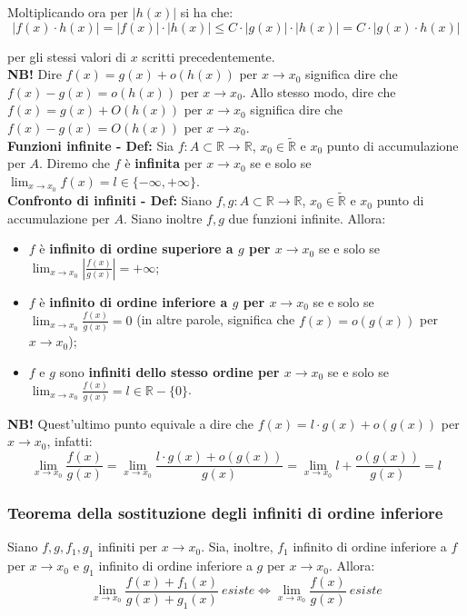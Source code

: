 \documentclass{article}
\begin{document}
\noindent Moltiplicando ora per $|h(x)|$ si ha che:
\begin{equation*}
    |f(x) \cdot h(x)| = |f(x)| \cdot |h(x)| \leq C \cdot |g(x)| \cdot |h(x)| = C \cdot |g(x) \cdot h(x)|
\end{equation*}

\noindent per gli stessi valori di $x$ scritti precedentemente.\\

\noindent\textbf{NB!} Dire $f(x) = g(x) + o(h(x))$ per $x \to x_0$ significa dire che $f(x) - g(x) = o(h(x))$ per $x \to x_0$. Allo stesso modo, dire che  $f(x) = g(x) + O(h(x))$ per $x \to x_0$ significa dire che $f(x) - g(x) = O(h(x))$ per $x \to x_0$. \\

\noindent\textbf{Funzioni infinite - Def:} Sia $f: A \subset \mathbb{R} \xrightarrow{} \mathbb{R}$, $x_0 \in \widetilde{\mathbb{R}}$ e $x_0$ punto di accumulazione per $A$. Diremo che $f$ è \textbf{infinita} per $x \to x_0$ se e solo se $\lim_{x \to x_0} f(x) = l \in \{-\infty, +\infty\}$.\\

\noindent\textbf{Confronto di infiniti - Def:} Siano $f, g: A \subset \mathbb{R} \xrightarrow{} \mathbb{R}$, $x_0 \in \widetilde{\mathbb{R}}$ e $x_0$ punto di accumulazione per $A$. Siano inoltre $f, g$ due funzioni infinite. Allora:
\begin{itemize}
    \item $f$ è \textbf{infinito di ordine superiore a $g$ per $x \to x_0$} se e solo se $\lim_{x \to x_0} \left|\frac{f(x)}{g(x)}\right| = +\infty$;
    \item $f$ è \textbf{infinito di ordine inferiore a $g$ per $x \to x_0$} se e solo se $\lim_{x \to x_0} \frac{f(x)}{g(x)} = 0$ (in altre parole, significa che $f(x) = o(g(x))$ per $x \to x_0$);
    \item $f$ e $g$ sono \textbf{infiniti dello stesso ordine per $x \to x_0$} se e solo se $\lim_{x \to x_0} \frac{f(x)}{g(x)} = l \in \mathbb{R} - \{0\}$.
\end{itemize}

\noindent\textbf{NB!} Quest'ultimo punto equivale a dire che $f(x) = l \cdot g(x) + o(g(x))$ per $x \to x_0$, infatti:
\begin{equation*}
    \lim_{x \to x_0} \frac{f(x)}{g(x)} = \lim_{x \to x_0} \frac{l \cdot g(x) + o(g(x))}{g(x)} = \lim_{x \to x_0} l + \frac{o(g(x))}{g(x)} = l
\end{equation*}

\subsubsection{Teorema della sostituzione degli infiniti di ordine inferiore}
Siano $f, g, f_1, g_1$ infiniti per $x \to x_0$. Sia, inoltre, $f_1$ infinito di ordine inferiore a $f$ per $x \to x_0$ e $g_1$ infinito di ordine inferiore a $g$ per $x \to x_0$. Allora:
\begin{equation*}
    \lim_{x \to x_0} \frac{f(x) + f_1(x)}{g(x) + g_1(x)} \ esiste \iff \lim_{x \to x_0} \frac{f(x)}{g(x)} \ esiste
\end{equation*}
\end{document}
